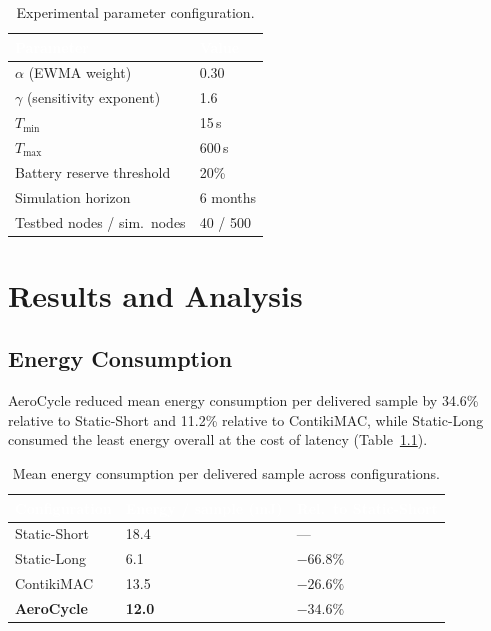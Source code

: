 \documentclass[12pt,a4paper]{report}
\begin{document}
\begin{table}[H]
\centering
\caption{Experimental parameter configuration.}
\label{tab:params}
\begin{tabularx}{\textwidth}{@{}lX@{}}
\toprule
\rowcolor{nustgreen}
\textcolor{white}{\bfseries Parameter} & \textcolor{white}{\bfseries Value} \\
\midrule
$\alpha$ (EWMA weight)     & 0.30 \\
\rowcolor{nustmist}
$\gamma$ (sensitivity exponent) & 1.6 \\
$T_{\min}$                 & 15\,s \\
\rowcolor{nustmist}
$T_{\max}$                 & 600\,s \\
Battery reserve threshold  & 20\% \\
\rowcolor{nustmist}
Simulation horizon          & 6 months \\
Testbed nodes / sim.\ nodes & 40 / 500 \\
\bottomrule
\end{tabularx}
\end{table}

\chapter{Results and Analysis}
\label{ch:results}

\section{Energy Consumption}
AeroCycle reduced mean energy consumption per delivered sample by 34.6\% relative to
Static-Short and 11.2\% relative to ContikiMAC, while Static-Long consumed the least energy
overall at the cost of latency (Table~\ref{tab:energy}).

\begin{table}[H]
\centering
\caption{Mean energy consumption per delivered sample across configurations.}
\label{tab:energy}
\begin{tabularx}{\textwidth}{@{}lXX@{}}
\toprule
\rowcolor{nustgreen}
\textcolor{white}{\bfseries Configuration} & \textcolor{white}{\bfseries Energy / sample (mJ)} &
\textcolor{white}{\bfseries Rel.\ to Static-Short} \\
\midrule
Static-Short & 18.4 & --- \\
\rowcolor{nustmist}
Static-Long  & 6.1  & $-66.8\%$ \\
ContikiMAC   & 13.5 & $-26.6\%$ \\
\rowcolor{nustmist}
\textbf{AeroCycle} & \textbf{12.0} & \textbf{$-34.6\%$} \\
\bottomrule
\end{tabularx}
\end{table}
\end{document}
